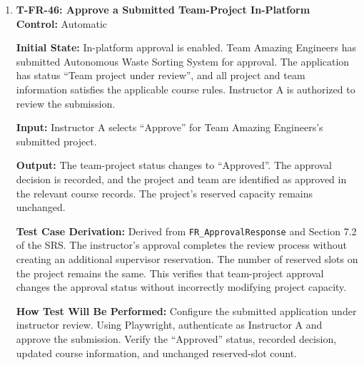 \documentclass[12pt, titlepage]{article}
\begin{document}
\begin{enumerate}
\textbf{Test Case Derivation:} Derived from \texttt{FR\_ApprovalPreflightValidate} and \texttt{FR\_ValidateTeamRules}. For team size $n$, the configured validity constraint is

\[
3 \leq n \leq 5.
\]

Therefore, $n=2$ and $n=6$ must fail validation, while $n=3$ and $n=5$ satisfy the boundary conditions. This verifies that approval preflight checks enforce the current course rules.

\textbf{How Test Will Be Performed:} Independently configure the four team membership scenarios using test fixtures. For each scenario, authenticate as an authorized team member and attempt submission. Verify the expected acceptance or rejection and ensure rejected submissions do not create instructor review records.

\item \label{T-FR-46}\textbf{T-FR-46: Approve a Submitted Team-Project In-Platform}\\

\textbf{Control:} Automatic

\textbf{Initial State:} In-platform approval is enabled. Team Amazing Engineers has submitted Autonomous Waste Sorting System for approval. The application has status ``Team project under review'', and all project and team information satisfies the applicable course rules. Instructor A is authorized to review the submission.

\textbf{Input:} Instructor A selects ``Approve'' for Team Amazing Engineers's submitted project.

\textbf{Output:} The team-project status changes to ``Approved''. The approval decision is recorded, and the project and team are identified as approved in the relevant course records. The project's reserved capacity remains unchanged.

\textbf{Test Case Derivation:} Derived from \texttt{FR\_ApprovalResponse} and Section 7.2 of the SRS. The instructor's approval completes the review process without creating an additional supervisor reservation. The number of reserved slots on the project remains the same. This verifies that team-project approval changes the approval status without incorrectly modifying project capacity.

\textbf{How Test Will Be Performed:} Configure the submitted application under instructor review. Using Playwright, authenticate as Instructor A and approve the submission. Verify the ``Approved'' status, recorded decision, updated course information, and unchanged reserved-slot count.


\end{enumerate}
\end{document}
